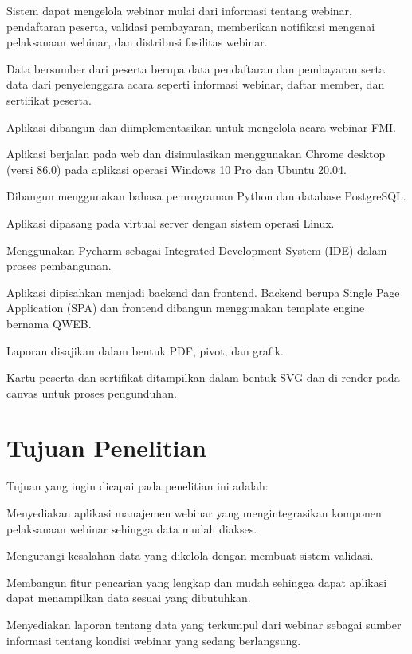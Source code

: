\begin{ol}
  \item Sistem dapat mengelola webinar mulai dari informasi tentang webinar, pendaftaran peserta, validasi pembayaran, memberikan notifikasi mengenai pelaksanaan webinar, dan distribusi fasilitas webinar.
  \item Data bersumber dari peserta berupa data pendaftaran dan pembayaran serta data dari penyelenggara acara seperti informasi webinar, daftar member, dan sertifikat peserta.
  \item Aplikasi dibangun dan diimplementasikan untuk mengelola acara webinar FMI.
  \item Aplikasi berjalan pada web dan disimulasikan menggunakan Chrome desktop (versi 86.0) pada aplikasi operasi Windows 10 Pro dan Ubuntu 20.04.
  \item Dibangun menggunakan bahasa pemrograman Python dan database PostgreSQL.
  \item Aplikasi dipasang pada virtual server dengan sistem operasi Linux.
  \item Menggunakan Pycharm sebagai Integrated Development System (IDE) dalam proses pembangunan.
  \item Aplikasi dipisahkan menjadi backend dan frontend. Backend berupa Single Page Application (SPA) dan frontend dibangun menggunakan template engine bernama QWEB.
  \item Laporan disajikan dalam bentuk PDF, pivot, dan grafik.
  \item Kartu peserta dan sertifikat ditampilkan dalam bentuk SVG dan di render pada canvas untuk proses pengunduhan.
\end{ol}

\section{Tujuan Penelitian}

Tujuan yang ingin dicapai pada penelitian ini adalah:

\begin{ol}
  \item Menyediakan aplikasi manajemen webinar yang mengintegrasikan komponen pelaksanaan webinar sehingga data mudah diakses.
  \item Mengurangi kesalahan data yang dikelola dengan membuat sistem validasi.
  \item Membangun fitur pencarian yang lengkap dan mudah sehingga dapat aplikasi dapat menampilkan data sesuai yang dibutuhkan.
  \item Menyediakan laporan tentang data yang terkumpul dari webinar sebagai sumber informasi tentang kondisi webinar yang sedang berlangsung.
\end{ol}

